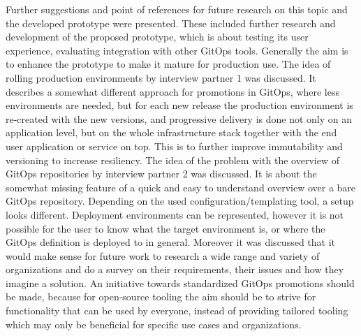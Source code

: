 Further suggestions and point of references for future research on this topic
and the developed prototype were presented.
These included
further research and development of the proposed prototype,
which is about testing its user experience, evaluating integration with
other GitOps tools. Generally the aim is to enhance the prototype
to make it mature for production use.
The idea of rolling production environments by interview partner 1 was discussed.
It describes a somewhat different approach for promotions in GitOps,
where less environments are needed, but for each new release the 
production environment is re-created with the new versions, and
progressive delivery is done not only on an application level, but on the whole
infrastructure stack together with the end user application or service on top.
This is to further improve immutability and versioning to increase resiliency.
The idea of the problem with the overview of GitOps repositories by interview partner 2
was discussed.
It is about the somewhat missing feature of a quick and easy to understand overview over a bare GitOps repository.
Depending on the used configuration/templating tool, a setup looks different.
Deployment environments can be represented, however it is not possible for the user
to know what the target environment is, or where the GitOps definition is deployed to in general.
Moreover it was discussed that it would make sense for future work
to research a wide range and variety of organizations and do a survey on
their requirements, their issues and how they imagine a solution.
An initiative towards standardized GitOps promotions should be made,
because for open-source tooling the aim should be to strive for functionality
that can be used by everyone,
instead of providing tailored tooling which may only be beneficial for specific use cases
and organizations.




















